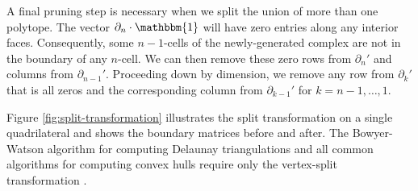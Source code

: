 \documentclass[twocolumn]{article}
\begin{document}
A final pruning step is necessary when we split the union of more than one polytope.
The vector $\partial_n\cdot\mathbbm{1}$ will have zero entries along any interior faces.
Consequently, some $n - 1$-cells of the newly-generated complex are not in the boundary of any $n$-cell.
We can then remove these zero rows from $\partial_n'$ and columns from $\partial_{n - 1}'$.
Proceeding down by dimension, we remove any row from $\partial_k'$ that is all zeros and the corresponding column from $\partial_{k - 1}'$ for $k = n - 1, \ldots, 1$.

Figure \ref{fig:split-transformation} illustrates the split transformation on a single quadrilateral and shows the boundary matrices before and after.
The Bowyer-Watson algorithm for computing Delaunay triangulations and all common algorithms for computing convex hulls require only the vertex-split transformation \cite{cheng2013delaunay}.
\end{document}
